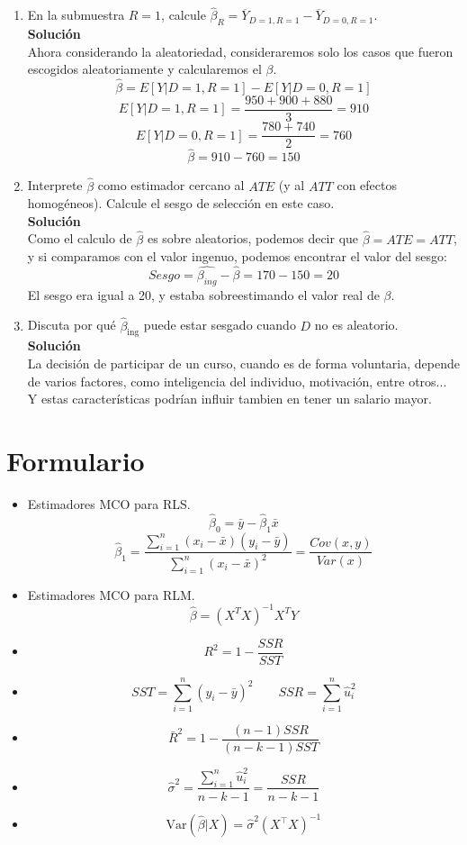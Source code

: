\documentclass[10pt,a4paper]{article}
\begin{document}
\begin{enumerate}
\begin{enumerate}
\item En la submuestra $R=1$, calcule $\hat\beta_{R} = \overline{Y}_{D=1,R=1}-\overline{Y}_{D=0,R=1}$.
\\
\textbf{Solución}
\\
Ahora considerando la aleatoriedad, consideraremos solo los casos que fueron escogidos aleatoriamente y calcularemos el $\beta$.
$$\hat\beta = E[{Y}|{D=1,R=1}]-E[{Y}|{D=0,R=1}]$$
$$ E[{Y}|{D=1,R=1}] = \frac{950+900+880}{3}=910$$
$$ E[{Y}|{D=0,R=1}] = \frac{780+740}{2}=760$$
$$\hat{\beta}= 910-760=150$$
\item Interprete $\hat\beta$ como estimador cercano al $ATE$ (y al $ATT$ con efectos homogéneos). Calcule el sesgo de selección en este caso.
\\
\textbf{Solución}
\\
Como el calculo de $\hat{\beta}$ es sobre aleatorios, podemos decir que $\hat{\beta}=ATE=ATT$, y si comparamos con el valor ingenuo, podemos encontrar el valor del sesgo:
$$Sesgo=\hat{\beta_{ing}}-\hat{\beta}=170-150=20$$
El sesgo era igual a 20, y estaba sobreestimando el valor real de $\beta$.
\item Discuta por qué $\hat\beta_{\text{ing}}$ puede estar sesgado cuando $D$ no es aleatorio.
\\
\textbf{Solución}
\\
La decisión de participar de un curso, cuando es de forma voluntaria, depende de varios factores, como inteligencia del individuo, motivación, entre otros... Y estas características podrían influir tambien en tener un salario mayor.
\end{enumerate}




\end{enumerate}

\section{Formulario}


\begin{itemize}

\item  Estimadores MCO para RLS.
{
$$\hat{\beta}_0 = \bar{y} - \hat{\beta}_1 \bar{x} $$
$$\hat{\beta}_1 = \frac{\sum_{i=1}^{n}(x_i - \bar{x})(y_i-\bar{y})}{\sum_{i=1}^{n}(x_i - \bar{x})^2}=\frac{Cov(x,y)}{Var(x)}$$}


\item  Estimadores MCO para RLM.
{
$${\hat{\beta}} = (X^TX)^{-1} X^TY $$}


    \item \[ R^2  = 1 - \frac{SSR}{SST} \] 
\item  $$SST = \sum_{i=1}^{n} (y_i - \bar{y})^2 \quad \quad SSR = \sum_{i=1}^{n}  \hat{u}_i^2 $$
    \item \[ \bar{R}^2 =  1 - \frac{(n-1)SSR}{(n-k-1)SST} \]

    \item  $$\hat{\sigma}^2 = \frac{\sum_{i=1}^{n} \hat{u}_i^2 }{n-k-1}= \frac{SSR}{n - k - 1}$$
    \item \[
\text{Var}(\hat{\beta}|X) = \hat{\sigma}^2(X^{\top}X)^{-1}
\]
    \end{itemize}
\end{document}
